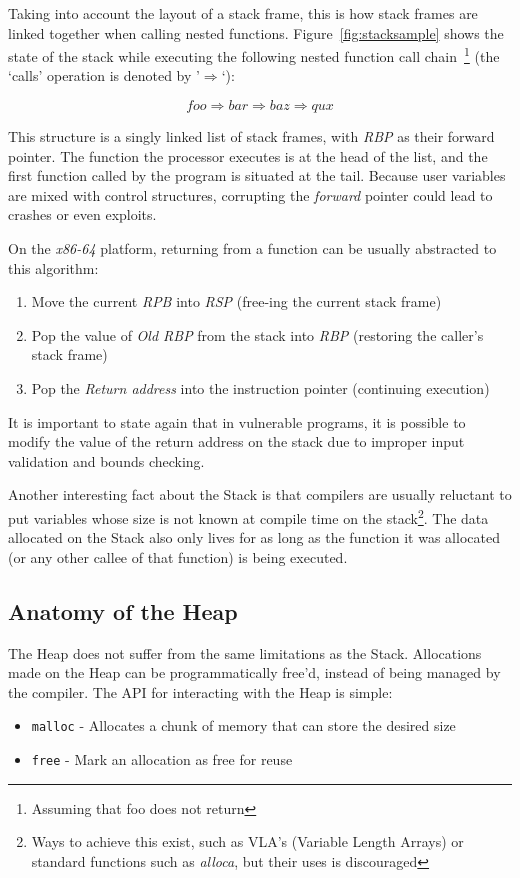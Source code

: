 \documentclass{article}
\begin{document}
Taking into account the layout of a stack frame, this is how stack frames are linked together when calling nested functions. Figure~\ref{fig:stacksample} shows the state of the stack while executing the following nested function call chain~\footnote{Assuming that foo does not return} (the `calls' operation is denoted by '$\Rightarrow$`):

\begin{equation}
  foo \Rightarrow bar \Rightarrow baz \Rightarrow qux
\end{equation}

This structure is a singly linked list of stack frames, with \emph{RBP} as their forward pointer. The function the processor executes is at the head of the list, and the first function called by the program is situated at the tail. Because user variables are mixed with control structures, corrupting the \emph{forward} pointer could lead to crashes or even exploits.

On the \emph{x86-64} platform, returning from a function can be usually abstracted to this algorithm:
\begin{enumerate}
  \item Move the current \emph{RPB} into \emph{RSP} (free-ing the current stack frame)
  \item Pop the value of \emph{Old RBP} from the stack into \emph{RBP} (restoring the caller's stack frame)
  \item Pop the \emph{Return address} into the instruction pointer (continuing execution)
\end{enumerate}

It is important to state again that in vulnerable programs, it is possible to modify the value of the return address on the stack due to improper input validation and bounds checking.

Another interesting fact about the Stack is that compilers are usually reluctant to put variables whose size is not known at compile time on the stack\footnote{Ways to achieve this exist, such as VLA's (Variable Length Arrays) or standard functions such as \emph{alloca}, but their uses is discouraged\cite{TorvaldsVLA}}. The data allocated on the Stack also only lives for as long as the function it was allocated (or any other callee of that function) is being executed.

\subsection{Anatomy of the Heap}
The Heap does not suffer from the same limitations as the Stack. Allocations made on the Heap can be programmatically free'd, instead of being managed by the compiler. The API for interacting with the Heap is simple:
\begin{itemize}
  \item \texttt{malloc} - Allocates a chunk of memory that can store the desired size
  \item \texttt{free} - Mark an allocation as free for reuse
\end{itemize}
\end{document}
